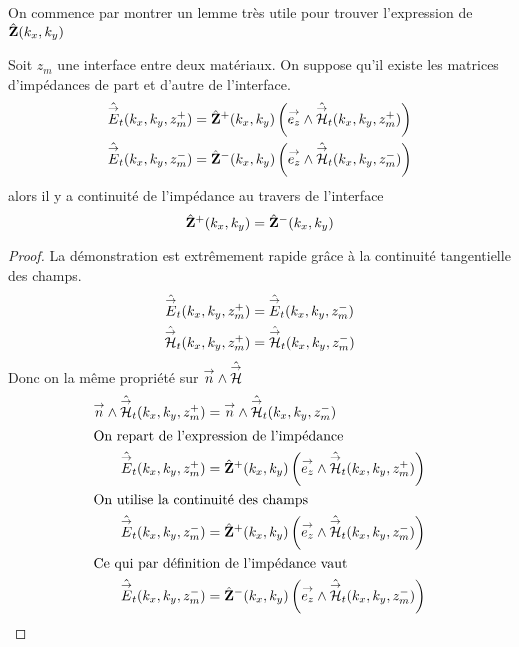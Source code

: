         On commence par montrer un lemme très utile pour trouver l'expression de \(\hat {\mathbf{Z}}(k_x,k_y)\)
        \begin{lemme}
          \label{lem:plan:continuite_impedance}
          Soit \(z_m\) une interface entre deux matériaux. On suppose qu'il existe les matrices d'impédances de part et d'autre de l'interface.
          \begin{align*}
              \hat{{\overset{\rightarrow}{E}}}_t(k_x,k_y,z_m^+) &= \hat{\mathbf{Z}}^+(k_x,k_y) \left({\overset{\rightarrow}{e_z}} \wedge \hat{{\overset{\rightarrow}{\mathcal{H}}}}_t(k_x,k_y,z_m^+)\right)
              \\
              \hat{{\overset{\rightarrow}{E}}}_t(k_x,k_y,z_m^-) &= \hat{\mathbf{Z}}^-(k_x,k_y) \left({\overset{\rightarrow}{e_z}} \wedge \hat{{\overset{\rightarrow}{\mathcal{H}}}}_t(k_x,k_y,z_m^-)\right)
          \end{align*}
          alors il y a continuité de l'impédance au travers de l'interface
          \begin{equation*}
          \hat {\mathbf{Z}}^+(k_x,k_y) = \hat {\mathbf{Z}}^-(k_x,k_y)
          \end{equation*}
        \end{lemme}
        \begin{proof}
          La démonstration est extrêmement rapide grâce à la continuité tangentielle des champs.
          \begin{align*}
            \hat{{\overset{\rightarrow}{E}}}_t(k_x,k_y,z_m^+) &= \hat{{\overset{\rightarrow}{E}}}_t(k_x,k_y,z_m^-)
            \\
            \hat{{\overset{\rightarrow}{\mathcal{H}}}}_t(k_x,k_y,z_m^+) &= \hat{{\overset{\rightarrow}{\mathcal{H}}}}_t(k_x,k_y,z_m^-)
          \end{align*}
          Donc on la même propriété sur \({\overset{\rightarrow}{n}} \wedge \hat{{\overset{\rightarrow}{\mathcal{H}}}}\)
          \begin{align*}                
            {\overset{\rightarrow}{n}} \wedge \hat{{\overset{\rightarrow}{\mathcal{H}}}}_t(k_x,k_y,z_m^+) &= {\overset{\rightarrow}{n}} \wedge \hat{{\overset{\rightarrow}{\mathcal{H}}}}_t(k_x,k_y,z_m^-)
            \\
            \intertext{On repart de l'expression de l'impédance}
            \hat{{\overset{\rightarrow}{E}}}_t(k_x,k_y,z_m^+) &= \hat{\mathbf{Z}}^+(k_x,k_y) \left({\overset{\rightarrow}{e_z}} \wedge \hat{{\overset{\rightarrow}{\mathcal{H}}}}_t(k_x,k_y,z_m^+)\right)
            \\
            \intertext{On utilise la continuité des champs}
            \hat{{\overset{\rightarrow}{E}}}_t(k_x,k_y,z_m^-) &= \hat{\mathbf{Z}}^+(k_x,k_y) \left({\overset{\rightarrow}{e_z}} \wedge \hat{{\overset{\rightarrow}{\mathcal{H}}}}_t(k_x,k_y,z_m^-)\right)
            \\
            \intertext{Ce qui par définition de l'impédance vaut}
            \hat{{\overset{\rightarrow}{E}}}_t(k_x,k_y,z_m^-) &= \hat{\mathbf{Z}}^-(k_x,k_y) \left({\overset{\rightarrow}{e_z}} \wedge \hat{{\overset{\rightarrow}{\mathcal{H}}}}_t(k_x,k_y,z_m^-)\right)
          \end{align*}
        \end{proof}

